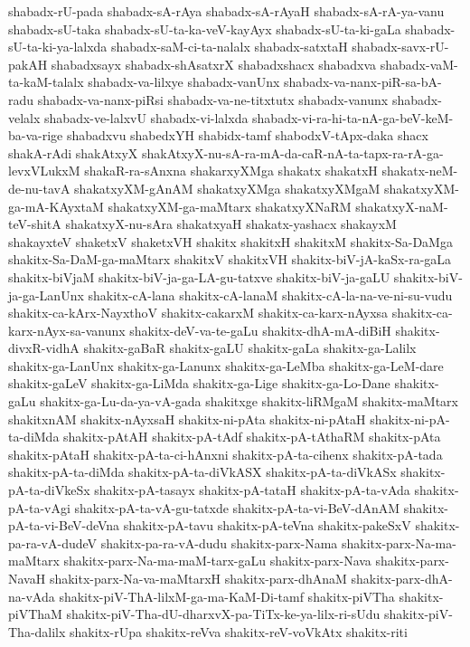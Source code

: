 {shabadx-rU-pada
shabadx-sA-rAya
shabadx-sA-rAyaH
shabadx-sA-rA-ya-vanu
shabadx-sU-taka
shabadx-sU-ta-ka-veV-kayAyx
shabadx-sU-ta-ki-gaLa
shabadx-sU-ta-ki-ya-lalxda
shabadx-saM-ci-ta-nalalx
shabadx-satxtaH
shabadx-savx-rU-pakAH
shabadxsayx
shabadx-shAsatxrX
shabadxshacx
shabadxva
shabadx-vaM-ta-kaM-talalx
shabadx-va-lilxye
shabadx-vanUnx
shabadx-va-nanx-piR-sa-bA-radu
shabadx-va-nanx-piRsi
shabadx-va-ne-titxtutx
shabadx-vanunx
shabadx-velalx
shabadx-ve-lalxvU
shabadx-vi-lalxda
shabadx-vi-ra-hi-ta-nA-ga-beV-keM-ba-va-rige
shabadxvu
shabedxYH
shabidx-tamf
shabodxV-tApx-daka
shacx
shakA-rAdi
shakAtxyX
shakAtxyX-nu-sA-ra-mA-da-caR-nA-ta-tapx-ra-rA-ga-levxVLukxM
shakaR-ra-sAnxna
shakarxyXMga
shakatx
shakatxH
shakatx-neM-de-nu-tavA
shakatxyXM-gAnAM
shakatxyXMga
shakatxyXMgaM
shakatxyXM-ga-mA-KAyxtaM
shakatxyXM-ga-maMtarx
shakatxyXNaRM
shakatxyX-naM-teV-shitA
shakatxyX-nu-sAra
shakatxyaH
shakatx-yashacx
shakayxM
shakayxteV
shaketxV
shaketxVH
shakitx
shakitxH
shakitxM
shakitx-Sa-DaMga
shakitx-Sa-DaM-ga-maMtarx
shakitxV
shakitxVH
shakitx-biV-jA-kaSx-ra-gaLa
shakitx-biVjaM
shakitx-biV-ja-ga-LA-gu-tatxve
shakitx-biV-ja-gaLU
shakitx-biV-ja-ga-LanUnx
shakitx-cA-lana
shakitx-cA-lanaM
shakitx-cA-la-na-ve-ni-su-vudu
shakitx-ca-kArx-NayxthoV
shakitx-cakarxM
shakitx-ca-karx-nAyxsa
shakitx-ca-karx-nAyx-sa-vanunx
shakitx-deV-va-te-gaLu
shakitx-dhA-mA-diBiH
shakitx-divxR-vidhA
shakitx-gaBaR
shakitx-gaLU
shakitx-gaLa
shakitx-ga-Lalilx
shakitx-ga-LanUnx
shakitx-ga-Lanunx
shakitx-ga-LeMba
shakitx-ga-LeM-dare
shakitx-gaLeV
shakitx-ga-LiMda
shakitx-ga-Lige
shakitx-ga-Lo-Dane
shakitx-gaLu
shakitx-ga-Lu-da-ya-vA-gada
shakitxge
shakitx-liRMgaM
shakitx-maMtarx
shakitxnAM
shakitx-nAyxsaH
shakitx-ni-pAta
shakitx-ni-pAtaH
shakitx-ni-pA-ta-diMda
shakitx-pAtAH
shakitx-pA-tAdf
shakitx-pA-tAthaRM
shakitx-pAta
shakitx-pAtaH
shakitx-pA-ta-ci-hAnxni
shakitx-pA-ta-cihenx
shakitx-pA-tada
shakitx-pA-ta-diMda
shakitx-pA-ta-diVkASX
shakitx-pA-ta-diVkASx
shakitx-pA-ta-diVkeSx
shakitx-pA-tasayx
shakitx-pA-tataH
shakitx-pA-ta-vAda
shakitx-pA-ta-vAgi
shakitx-pA-ta-vA-gu-tatxde
shakitx-pA-ta-vi-BeV-dAnAM
shakitx-pA-ta-vi-BeV-deVna
shakitx-pA-tavu
shakitx-pA-teVna
shakitx-pakeSxV
shakitx-pa-ra-vA-dudeV
shakitx-pa-ra-vA-dudu
shakitx-parx-Nama
shakitx-parx-Na-ma-maMtarx
shakitx-parx-Na-ma-maM-tarx-gaLu
shakitx-parx-Nava
shakitx-parx-NavaH
shakitx-parx-Na-va-maMtarxH
shakitx-parx-dhAnaM
shakitx-parx-dhA-na-vAda
shakitx-piV-ThA-lilxM-ga-ma-KaM-Di-tamf
shakitx-piVTha
shakitx-piVThaM
shakitx-piV-Tha-dU-dharxvX-pa-TiTx-ke-ya-lilx-ri-sUdu
shakitx-piV-Tha-dalilx
shakitx-rUpa
shakitx-reVva
shakitx-reV-voVkAtx
shakitx-riti
}

